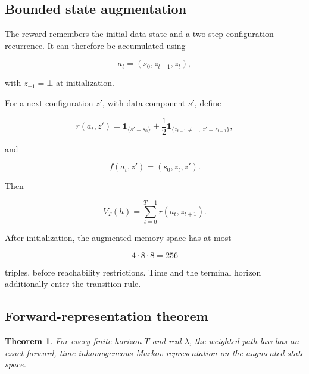 \documentclass[11pt]{article}
\newtheorem{theorem}{Theorem}
\theoremstyle{remark}
\newcommand{\ind}{\mathbf{1}}
\begin{document}
\subsection{Bounded state augmentation}

The reward remembers the initial data state and a two-step configuration recurrence. It can therefore be accumulated using

\begin{equation}
a_t=(s_0,z_{t-1},z_t),
\end{equation}

with \(z_{-1}=\bot\) at initialization.

For a next configuration \(z'\), with data component \(s'\), define

\begin{equation}
r(a_t,z')
=
\ind_{\{s'=s_0\}}
+
\frac12\ind_{\{z_{t-1}\ne\bot,\ z'=z_{t-1}\}},
\end{equation}

and

\begin{equation}
f(a_t,z')=(s_0,z_t,z').
\end{equation}

Then

\begin{equation}
V_T(h)
=
\sum_{t=0}^{T-1}r(a_t,z_{t+1}).
\end{equation}

After initialization, the augmented memory space has at most

\begin{equation}
4\cdot8\cdot8=256
\end{equation}

triples, before reachability restrictions. Time and the terminal horizon additionally enter the transition rule.

\subsection{Forward-representation theorem}

\begin{theorem}
For every finite horizon \(T\) and real \(\lambda\), the weighted path law has an exact forward, time-inhomogeneous Markov representation on the augmented state space.
\end{theorem}
\end{document}

